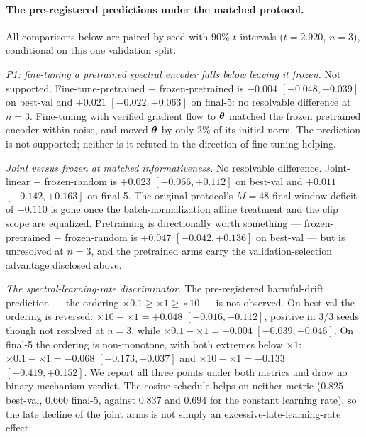 \paragraph{The pre-registered predictions under the matched protocol.}
All comparisons below are paired by seed with $90\%$ $t$-intervals
($t = 2.920$, $n = 3$), conditional on this one validation split.

\emph{P1: fine-tuning a pretrained spectral encoder falls below leaving
it frozen.} Not supported. Fine-tune-pretrained $-$ frozen-pretrained
is $-0.004$ $[-0.048, +0.039]$ on best-val and $+0.021$
$[-0.022, +0.063]$ on final-5: no resolvable difference at $n=3$.
Fine-tuning with verified gradient flow to ${\boldsymbol{\theta}}$ matched the frozen
pretrained encoder within noise, and moved ${\boldsymbol{\theta}}$ by only $2\%$ of
its initial norm. The prediction is not supported; neither is it
refuted in the direction of fine-tuning helping.

\emph{Joint versus frozen at matched informativeness.} No resolvable
difference. Joint-linear $-$ frozen-random is $+0.023$
$[-0.066, +0.112]$ on best-val and $+0.011$ $[-0.142, +0.163]$ on
final-5. The original protocol's $M{=}48$ final-window deficit of
$-0.110$ is gone once the batch-normalization affine treatment and the
clip scope are equalized. Pretraining is directionally worth something
--- frozen-pretrained $-$ frozen-random is $+0.047$
$[-0.042, +0.136]$ on best-val --- but is unresolved at $n=3$, and the
pretrained arms carry the validation-selection advantage disclosed
above.

\emph{The spectral-learning-rate discriminator.} The pre-registered
harmful-drift prediction --- the ordering
$\times 0.1 \ge \times 1 \ge \times 10$ --- is not observed. On best-val
the ordering is reversed: $\times 10 - \times 1 = +0.048$
$[-0.016, +0.112]$, positive in $3/3$ seeds though not resolved at
$n=3$, while $\times 0.1 - \times 1 = +0.004$ $[-0.039, +0.046]$. On
final-5 the ordering is non-monotone, with both extremes below
$\times 1$: $\times 0.1 - \times 1 = -0.068$ $[-0.173, +0.037]$ and
$\times 10 - \times 1 = -0.133$ $[-0.419, +0.152]$. We report all three
points under both metrics and draw no binary mechanism verdict. The
cosine schedule helps on neither metric ($0.825$ best-val, $0.660$
final-5, against $0.837$ and $0.694$ for the constant learning rate),
so the late decline of the joint arms is not simply an
excessive-late-learning-rate effect.

